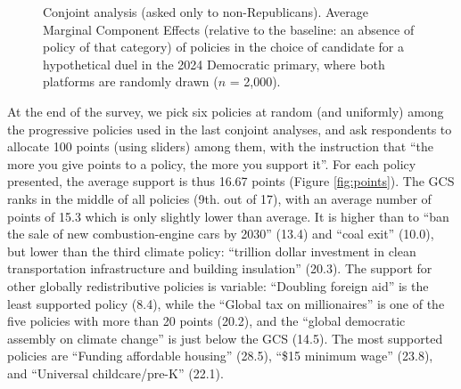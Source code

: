 \begin{figure}

  \caption{Conjoint analysis (asked only to non-Republicans). Average Marginal Component Effects (relative to the baseline: an absence of policy of that category) of policies in the choice of candidate for a hypothetical duel in the 2024 Democratic primary, where both platforms are randomly drawn ($n$ = 2,000).}\label{fig:ca_r}
\end{figure}

At the end of the survey, we pick six policies at random (and uniformly) among the progressive policies used in the last conjoint analyses, and ask respondents to allocate 100 points (using sliders) among them, with the instruction that ``the more you give points to a policy, the more you support it''. For each policy presented, the average support is thus 16.67 points (Figure \ref{fig:points}). The GCS ranks in the middle of all policies (9th. out of 17), with an average number of points of 15.3 which is only slightly lower than average. It is higher than to ``ban the sale of new combustion-engine cars by 2030'' (13.4) and ``coal exit'' (10.0), but lower than the third climate policy: ``trillion dollar investment in clean transportation infrastructure and building insulation'' (20.3). The support for other globally redistributive policies is variable: ``Doubling foreign aid'' is the least supported policy (8.4), while the ``Global tax on millionaires'' is one of the five policies with more than 20 points (20.2), and the ``global democratic assembly on climate change'' is just below the GCS (14.5). The most supported policies are ``Funding affordable housing'' (28.5), ``\$15 minimum wage'' (23.8), and ``Universal childcare/pre-K'' (22.1). %

